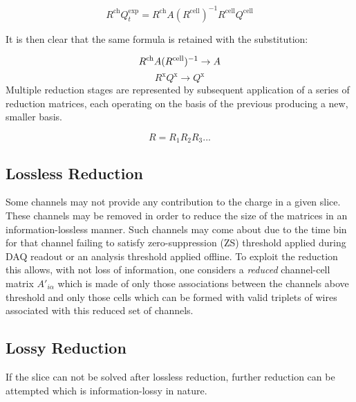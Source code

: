 \documentclass[letter]{article}
\begin{document}
\begin{equation}
  \label{eq:contraction}
  R^\mathrm{ch} Q^\mathrm{exp}_t = 
R^\mathrm{ch} 
A (R^\mathrm{cell})^{-1} 
R^\mathrm{cell}  
Q^\mathrm{cell}
\end{equation}

\noindent It is then clear that the same formula is retained with the
substitution:

\begin{equation}
  \label{eq:subst}
  R^\mathrm{ch} A (R^\mathrm{cell})^{-1} \to A\\
\end{equation}
\begin{equation}
  \label{eq:subst2}
  R^\mathrm{x} Q^\mathrm{x} \to Q^\mathrm{x}
\end{equation}
Multiple reduction stages are represented by subsequent application of
a series of reduction matrices, each operating on the basis of the
previous producing a new, smaller basis.



\begin{equation}
  \label{eq:multipleR}
  R = R_1 R_2 R_3 ...
\end{equation}

\subsection{Lossless Reduction}

Some channels may not provide any contribution to the charge in a
given slice.
These channels may be removed in order to reduce the size of the
matrices in an information-lossless manner.
Such channels may come about due to the time bin for that channel failing to
satisfy zero-suppression (ZS) threshold applied during DAQ readout or
an analysis threshold applied offline.
To exploit the reduction this allows, with not loss of information,
one considers a \textit{reduced} channel-cell matrix
$A'_{i\alpha}$ which is made of only those associations
between the channels above threshold and only those cells which can be
formed with valid triplets of wires associated with this reduced set of
channels.

\subsection{Lossy Reduction}

If the slice can not be solved after lossless reduction, further
reduction can be attempted which is information-lossy in nature.
\end{document}
